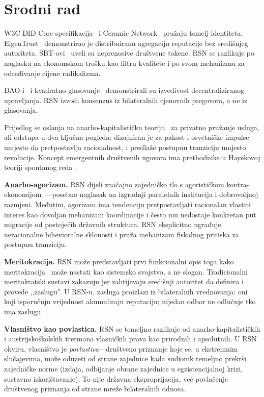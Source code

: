 \documentclass[11pt,a4paper,twocolumn]{article}
\begin{document}
\section{Srodni rad}

W3C DID Core specifikacija~\cite{did2022} i Ceramic Network~\cite{ceramic2023} pružaju temelj identiteta. EigenTrust~\cite{kamvar2003} demonstrirao je distribuiranu agregaciju reputacije bez središnjeg autoriteta. SBT-ovi~\cite{weyl2022} uveli su neprenosive društvene tokene. RSN se razlikuje po naglasku na ekonomskom trošku kao filtru kvalitete i po svom mehanizmu za određivanje cijene radikalizma.

DAO-i~\cite{buterin2014} i kvadratno glasovanje~\cite{buterin2019} demonstrirali su izvedivost decentraliziranog upravljanja. RSN izvodi konsenzus iz bilateralnih cjenovnih pregovora, a ne iz glasovanja.

Prijedlog se oslanja na anarho-kapitalističku teoriju~\cite{rothbard1973,hoppe2001} za privatno pružanje usluga, ali odstupa u dva ključna pogleda: dizajniran je za pakost i osvetničke impulse umjesto da pretpostavlja racionalnost, i predlaže postupnu tranziciju umjesto revolucije. Koncept emergentnih društvenih ugovora ima prethodnike u Hayekovoj teoriji spontanog reda~\cite{hayek1973}.

\textbf{Anarho-agorizam.} RSN dijeli značajno zajedničko tlo s agorističkom kontra-ekonomijom~\cite{konkin2006}---posebno naglasak na izgradnji paralelnih institucija i dobrovoljnoj razmjeni. Međutim, agorizam ima tendenciju pretpostavljati racionalan vlastiti interes kao dovoljan mehanizam koordinacije i često mu nedostaje konkretan put migracije od postojećih državnih struktura. RSN eksplicitno ugrađuje neracionalne bihevioralne sklonosti i pruža mehanizam fiskalnog pritiska za postupnu tranziciju.

\textbf{Meritokracija.} RSN može predstavljati prvi funkcionalni opis toga kako meritokracija~\cite{young1958} može nastati kao sistemsko svojstvo, a ne slogan. Tradicionalni meritokratski sustavi zakazuju jer zahtijevaju središnji autoritet da definira i provede ,,zaslugu''. U RSN-u, zasluga proizlazi iz bilateralnih vrednovanja: oni koji isporučuju vrijednost akumuliraju reputaciju; nijedan odbor ne odlučuje tko ima zaslugu.

\textbf{Vlasništvo kao povlastica.} RSN se temeljno razlikuje od anarho-kapitalističkih i austrijskoškolskih tretmana vlasničkih prava kao prirodnih i apsolutnih. U RSN okviru, vlasništvo je \emph{povlastica}---društveno priznanje koje se, u ekstremnim slučajevima, može oduzeti od strane zajednice kada sudionik temeljno prekrši zajedničke norme (izdaja, odbijanje obrane zajednice u egzistencijalnoj krizi, sustavno iskorištavanje). To nije državna eksproprijacija, već povlačenje društvenog priznanja od strane mreže bilateralnih odnosa.
\end{document}
